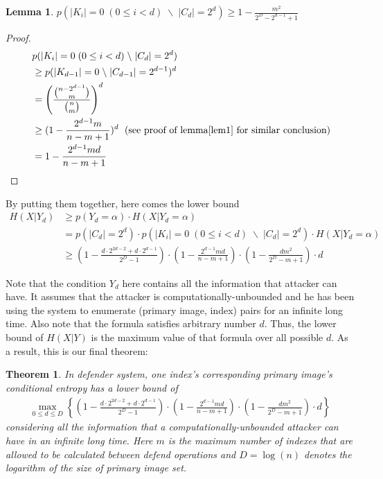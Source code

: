 \documentclass[10pt,a4paper]{article}
\newtheorem{mylemma}{Lemma}
\newtheorem{mytheorem}{Theorem}
\begin{document}
		\begin{mylemma}
			$p(|K_i| = 0	\; (0 \leq i < d) \; \backslash \; |C_d| = 2^d) 
				\geq 1-\frac{m^2}{2^D-2^{d-1}+1}$
		\end{mylemma}
		
		\begin{proof}
			\begin{align*}
				&p(|K_i| = 0	\; (0 \leq i < d) \; \backslash \; |C_d| = 2^d) \\\
					&\geq p(|K_{d-1}| = 0 \; \backslash \; |C_{d-1}| = 2^{d-1})^d\\
					&= \left(\frac{\binom{n-2^{d-1}}{m}}{\binom{n}{m}} \right)^d\\
					&\geq (1-\frac{2^{d-1}m}{n-m+1})^d	\; \text{ (see proof of lemma\ref{lem1} for similar conclusion})\\
					&= 1-\frac{2^{d-1}m d}{n-m+1}
			\end{align*}
		\end{proof}
		
		By putting them together, here comes the lower bound
		\begin{align*}
			H(X | Y_d) &\geq p(Y_d = \alpha) \cdot H(X | Y_d = \alpha)\\
				&= p(|C_d| = 2^d) \cdot p(|K_i| = 0	\; (0 \leq i < d) \; \backslash \; |C_d| = 2^d) \cdot H(X | Y_d = \alpha)\\
				&\geq (1-\frac{d \cdot 2^{2d-2}+d \cdot 2^{d-1}}{2^D-1})
					\cdot (1-\frac{2^{d-1}m d}{n-m+1}) 
					\cdot (1-\frac{dm^2}{2^D-m+1}) \cdot d 
		\end{align*}
		
		Note that the condition $Y_d$ here contains all the
		information that attacker can have. It assumes that
		the attacker is computationally-unbounded and he has
		been using the system to enumerate (primary image, index) pairs
		for an infinite long time. Also note that the formula
		satisfies arbitrary number $d$. Thus, the lower bound
		of $H(X | Y)$ is the maximum value of that formula
		over all possible $d$.
		As a result, this is our final theorem:
		\begin{mytheorem}\label{thm1}
			In defender system, one index's corresponding
			primary image's conditional entropy has a lower bound of
			\begin{align*}
				\max_{0 \leq d \leq D} \left\{ (1-\frac{d \cdot 2^{2d-2}+d \cdot 2^{d-1}}{2^D-1})
					\cdot (1-\frac{2^{d-1}m d}{n-m+1}) 
					\cdot (1-\frac{dm^2}{2^D-m+1}) \cdot d  \right\}
			\end{align*}
			considering all the information
			that a computationally-unbounded attacker can
			have in an infinite long time. Here $m$ is
			the maximum number of indexes that are allowed to be calculated
			between defend operations and $D = \log(n)$ denotes the
			logarithm of the size of primary image set.
		\end{mytheorem}
		
\end{document}
